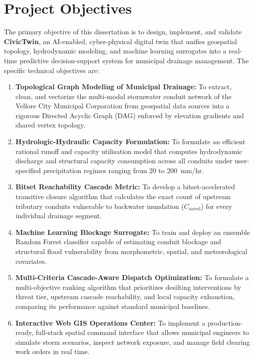 \documentclass[12pt,a4paper]{report}
\begin{document}
\section{Project Objectives}
The primary objective of this dissertation is to design, implement, and validate \textbf{CivicTwin}, an AI-enabled, cyber-physical digital twin that unifies geospatial topology, hydrodynamic modeling, and machine learning surrogates into a real-time predictive decision-support system for municipal drainage management. The specific technical objectives are:
\begin{enumerate}
    \item \textbf{Topological Graph Modeling of Municipal Drainage:} To extract, clean, and vectorize the multi-modal stormwater conduit network of the Vellore City Municipal Corporation from geospatial data sources into a rigorous Directed Acyclic Graph (DAG) enforced by elevation gradients and shared vertex topology.
    \item \textbf{Hydrologic-Hydraulic Capacity Formulation:} To formulate an efficient rational runoff and capacity utilisation model that computes hydrodynamic discharge and structural capacity consumption across all conduits under user-specified precipitation regimes ranging from 20 to 200~mm/hr.
    \item \textbf{Bitset Reachability Cascade Metric:} To develop a bitset-accelerated transitive closure algorithm that calculates the exact count of upstream tributary conduits vulnerable to backwater inundation ($C_{\text{saved}}$) for every individual drainage segment.
    \item \textbf{Machine Learning Blockage Surrogate:} To train and deploy an ensemble Random Forest classifier capable of estimating conduit blockage and structural flood vulnerability from morphometric, spatial, and meteorological covariates.
    \item \textbf{Multi-Criteria Cascade-Aware Dispatch Optimization:} To formulate a multi-objective ranking algorithm that prioritizes desilting interventions by threat tier, upstream cascade reachability, and local capacity exhaustion, comparing its performance against standard municipal baselines.
    \item \textbf{Interactive Web GIS Operations Center:} To implement a production-ready, full-stack spatial command interface that allows municipal engineers to simulate storm scenarios, inspect network exposure, and manage field clearing work orders in real time.
\end{enumerate}
\end{document}
